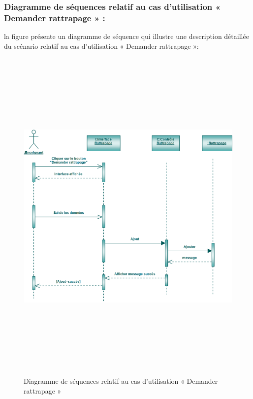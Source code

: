 \documentclass[12 pt ]{report}
\begin{document}
\subsubsection{Diagramme de séquences relatif au cas d’utilisation « Demander rattrapage » :}
la figure   présente un diagramme de séquence qui illustre une description détaillée du scénario relatif au cas d’utilisation « Demander rattrapage »: 
\begin{figure}[h]
 \begin{center}
\includegraphics[width= 18 cm ,height=  17cm]{sdr.PNG}
\caption{Diagramme de séquences relatif au cas d’utilisation « Demander rattrapage  »}

\end{center}
\end{figure}
\end{document}
